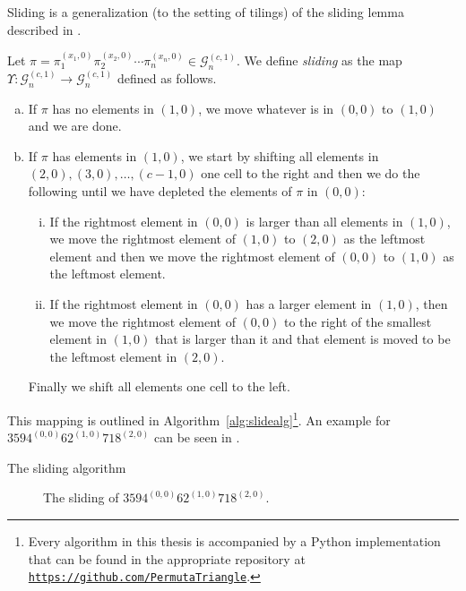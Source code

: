 Sliding is a generalization (to the setting of tilings) of the sliding lemma described in \citeauthor{slide} \cite[Lemma 2.2]{slide}.

\begin{definition}
Let $\pi = \pi_1^{(x_1,0)}\pi_2^{(x_2,0)}\cdots\pi_n^{(x_n,0)} \in \mathcal{G}^{(c,1)}_n$. We define \emph{sliding} as the map $\Upsilon: \mathcal{G}^{(c,1)}_n \to \mathcal{G}^{(c,1)}_n$ defined as follows.
\begin{enumerate}[a)]
    \item If $\pi$ has no elements in $(1,0)$, we move whatever is in $(0,0)$ to $(1,0)$ and we are done.
    \item If $\pi$ has elements in $(1,0)$, we start by shifting all elements in $(2,0), (3,0), \dotsc, (c-1,0)$ one cell to the right and then we do the following until we have depleted the elements of $\pi$ in $(0,0)$:
    \begin{enumerate}[i.]
        \item If the rightmost element in $(0,0)$ is larger than all elements in $(1,0)$, we move the rightmost element of $(1,0)$ to $(2,0)$ as the leftmost element and then we move the rightmost element of $(0,0)$ to $(1,0)$ as the leftmost element.
        \item If the rightmost element in $(0,0)$ has a larger element in $(1,0)$, then we move the rightmost element of $(0,0)$ to the right of the smallest element in $(1,0)$ that is larger than it and that element is moved to be the leftmost element in $(2,0)$.
    \end{enumerate}
    Finally we shift all elements one cell to the left.
\end{enumerate}
\end{definition}

This mapping is outlined in Algorithm~\ref{alg:slidealg}\footnote{Every algorithm in this thesis is accompanied by a Python implementation that can be found in the appropriate repository at \texttt{\href{https://github.com/PermutaTriangle}{https://github.com/PermutaTriangle}}.}. An example for $3594^{(0,0)}62^{(1,0)}718^{(2,0)}$ can be seen in .

\begin{algorithm}

\caption{The sliding algorithm}
\label{alg:slidealg}
\end{algorithm}

\begin{figure}[ht!]
    \centering
    
    \caption{The sliding of $3594^{(0,0)}62^{(1,0)}718^{(2,0)}$.}
    \label{fig:slide_gp_example}
\end{figure}

